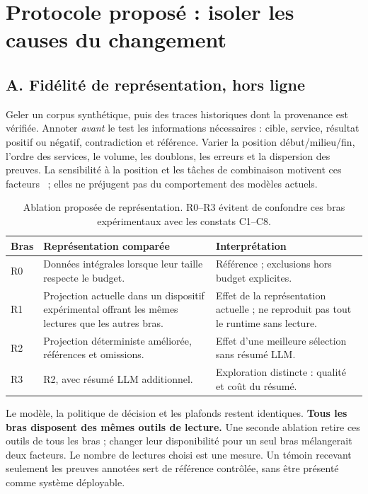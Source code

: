 \documentclass[11pt,a4paper]{article}
\begin{document}
\section{Protocole proposé : isoler les causes du changement}
\label{sec:protocol}
\subsection{A. Fidélité de représentation, hors ligne}
Geler un corpus synthétique, puis des traces historiques dont la provenance est vérifiée. Annoter \emph{avant} le test les informations nécessaires : cible, service, résultat positif ou négatif, contradiction et référence. Varier la position début/milieu/fin, l'ordre des services, le volume, les doublons, les erreurs et la dispersion des preuves. La sensibilité à la position et les tâches de combinaison motivent ces facteurs~\cite{liu,ruler} ; elles ne préjugent pas du comportement des modèles actuels.

\begin{table}[H]
\centering\small
\noindent\begin{tabularx}{\linewidth}{@{}>{\raggedright\arraybackslash}p{12mm}Y>{\raggedright\arraybackslash}p{52mm}@{}}
\toprule
\textbf{Bras} & \textbf{Représentation comparée} & \textbf{Interprétation} \\
\midrule
R0 & Données intégrales lorsque leur taille respecte le budget. & Référence ; exclusions hors budget explicites. \\
R1 & Projection actuelle dans un dispositif expérimental offrant les mêmes lectures que les autres bras. & Effet de la représentation actuelle ; ne reproduit pas tout le runtime sans lecture. \\
R2 & Projection déterministe améliorée, références et omissions. & Effet d'une meilleure sélection sans résumé LLM. \\
R3 & R2, avec résumé LLM additionnel. & Exploration distincte : qualité et coût du résumé. \\
\bottomrule
\end{tabularx}
\caption{Ablation proposée de représentation. R0--R3 évitent de confondre ces bras expérimentaux avec les constats C1--C8.}
\label{tab:ablation}
\end{table}

Le modèle, la politique de décision et les plafonds restent identiques. \textbf{Tous les bras disposent des mêmes outils de lecture.} Une seconde ablation retire ces outils de tous les bras ; changer leur disponibilité pour un seul bras mélangerait deux facteurs. Le nombre de lectures choisi est une mesure. Un témoin recevant seulement les preuves annotées sert de référence contrôlée, sans être présenté comme système déployable.
\end{document}

